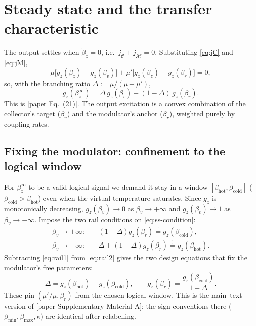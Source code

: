 \documentclass[11pt,a4paper]{article}
\newcommand{\calC}{\mathcal{C}}
\newcommand{\calM}{\mathcal{M}}
\newcommand{\gz}{g_z}
\theoremstyle{definition}
\theoremstyle{remark}
\begin{document}
\section{Steady state and the transfer characteristic}
\label{sec:transfer}
The output settles when $\dot\beta_z=0$, i.e.\ $j_{\calC}+j_\calM=0$.
Substituting \eqref{eq:jC} and \eqref{eq:jM},
\begin{equation}
\mu\big[\gz(\beta_z)-\gz(\beta_v)\big]
+ \mu'\big[\gz(\beta_z)-\gz(\beta_r)\big]=0,
\end{equation}
so, with the branching ratio $\Delta:=\mu/(\mu+\mu')$,
\begin{equation}
\boxed{\;
\gz(\beta_z^\infty) = \Delta\,\gz(\beta_v)+(1-\Delta)\,\gz(\beta_r).
\;}
\label{eq:ss-condition}
\end{equation}
This is [paper Eq.~(21)]. The output excitation is a convex combination
of the collector's target ($\beta_v$) and the modulator's anchor
($\beta_r$), weighted purely by coupling rates.

\subsection{Fixing the modulator: confinement to the logical window}
For $\beta_z^\infty$ to be a valid logical signal we demand it stay in a
window $[\beta_{\mathrm{hot}},\beta_{\mathrm{cold}}]$
($\beta_{\mathrm{cold}}>\beta_{\mathrm{hot}}$) even when the virtual
temperature saturates. Since $\gz$ is monotonically decreasing,
$\gz(\beta_v)\to0$ as $\beta_v\to+\infty$ and $\gz(\beta_v)\to1$ as
$\beta_v\to-\infty$. Impose the two rail conditions on
\eqref{eq:ss-condition}:
\begin{align}
\beta_v\to+\infty:&\quad (1-\Delta)\gz(\beta_r)
\overset{!}{=}\gz(\beta_{\mathrm{cold}}),
\label{eq:rail1}\\
\beta_v\to-\infty:&\quad \Delta+(1-\Delta)\gz(\beta_r)
\overset{!}{=}\gz(\beta_{\mathrm{hot}}).
\label{eq:rail2}
\end{align}
Subtracting \eqref{eq:rail1} from \eqref{eq:rail2} gives the two design
equations that fix the modulator's free parameters:
\begin{equation}
\boxed{\;
\Delta = \gz(\beta_{\mathrm{hot}})-\gz(\beta_{\mathrm{cold}}),
\qquad
\gz(\beta_r)=\frac{\gz(\beta_{\mathrm{cold}})}{1-\Delta}. \;}
\label{eq:mod-design}
\end{equation}
These pin $(\mu'/\mu,\beta_r)$ from the chosen logical window. This is the
main--text version of [paper Supplementary Material A]; the sign
conventions there ($\beta_{\min},\beta_{\max},\kappa$) are identical
after relabelling.
\end{document}
